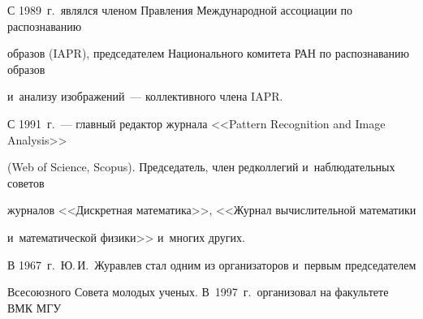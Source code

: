 \begin{floatingfigure}{50mm} %


\begin{center} %


\vspace*{6pt}


\mbox{%





\epsfxsize=39.007mm %


\epsfbox{nzur-2.eps}


}


\end{center}


\vspace*{-6pt}


\end{floatingfigure}





\noindent











     \thispagestyle{empty}


     


     С 1989~г.\ являлся членом Правления Международной ассоциации по распознаванию 


образов (IAPR), председателем Национального комитета РАН по распознаванию образов 


и~анализу изображений~--- коллективного члена IAPR.


     


     С 1991~г.~--- главный редактор журнала <<Pattern Recognition and Image Analysis>> 


(Web of Science, Scopus). Председатель, член редколлегий и~наблюдательных советов 


журналов <<Дискретная математика>>, <<Журнал вычислительной математики 


и~математической физики>> и~многих других.


      


      В 1967~г.\ Ю.\,И.~Журавлев стал одним из организаторов и~первым председателем 


Всесоюзного Совета молодых ученых. В~1997~г.\ организовал на факультете ВМК МГУ 


